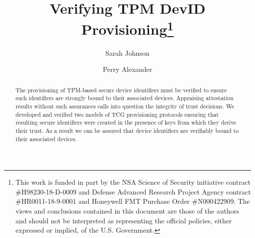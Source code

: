 \documentclass[runningheads]{llncs}
\begin{document}
%
\title{Verifying TPM DevID Provisioning\thanks{This work is funded in part
    by the NSA Science of Security initiative contract
    \#H98230-18-D-0009 and Defense Advanced Research Project Agency
    contract \#HR0011-18-9-0001 and Honeywell FMT Purchase Order
    \#N000422909. The views and conclusions contained in this document
    are those of the authors and should not be interpreted as
    representing the official policies, either expressed or implied,
    of the U.S. Government.}}
%
%
\author{Sarah Johnson \and
Perry Alexander}
%
%
%
\maketitle              %
%
\begin{abstract}
  The provisioning of TPM-based secure device identifiers must be
  verified to ensure such identifiers are strongly bound to their
  associated devices.  Appraising attestation results without such
  assurances calls into question the integrity of trust decisions.  We
  developed and verified two models of TCG provisioning protocols
  ensuring that resulting secure identifiers were created in the
  presence of keys from which they derive their trust.  As a result we
  can be assured that device identifiers are verifiably bound to their
  associated devices.

\end{abstract}
%
%
%
\end{document}
